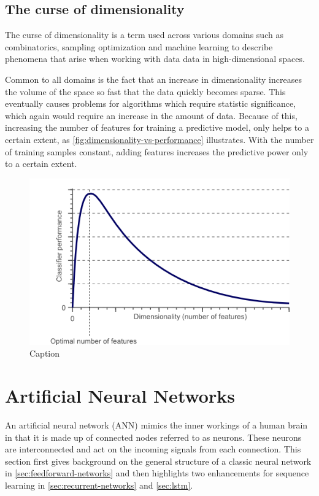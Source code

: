 \subsection{The curse of dimensionality}
The curse of dimensionality is a term used across various domains such as combinatorics, sampling optimization and machine learning to describe phenomena that arise when working with data data in high-dimensional spaces.

Common to all domains is the fact that an increase in dimensionality increases the volume of the space so fast that the data quickly becomes sparse. This eventually causes problems for algorithms which require statistic significance, which again would require an increase in the amount of data.
Because of this, increasing the number of features for training a predictive model, only helps to a certain extent, as \autoref{fig:dimensionality-vs-performance} illustrates. With the number of training samples constant, adding features increases the predictive power only to a certain extent.

\begin{figure}
    \centering
    \includegraphics[width=\textwidth]{gfx/dimensionality_vs_performance.png}
    \caption{Caption}
    \label{fig:dimensionality-vs-performance}
\end{figure}

\section{Artificial Neural Networks}\label{sec:artificial-neural-networks}
An artificial neural network (ANN) mimics the inner workings of a human brain in that it is made up of connected nodes referred to as neurons. These neurons are interconnected and act on the incoming signals from each connection. This section first gives background on the general structure of a classic neural network in \autoref{sec:feedforward-networks} and then highlights two enhancements for sequence learning in \autoref{sec:recurrent-networks} and \autoref{sec:lstm}.

